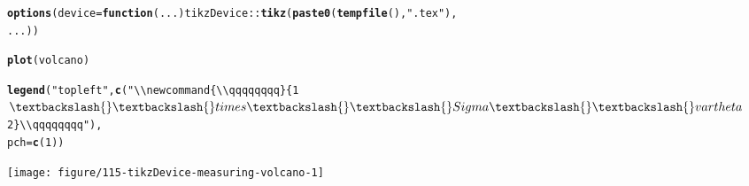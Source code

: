 \documentclass{article}\usepackage[]{graphicx}\usepackage[]{color}
\makeatletter
\def\maxwidth{ %
  \ifdim\Gin@nat@width>\linewidth
    \linewidth
  \else
    \Gin@nat@width
  \fi
}
\newcommand{\hlnum}[1]{\textcolor[rgb]{0.686,0.059,0.569}{#1}}%
\newcommand{\hlstr}[1]{\textcolor[rgb]{0.192,0.494,0.8}{#1}}%
\newcommand{\hlopt}[1]{\textcolor[rgb]{0,0,0}{#1}}%
\newcommand{\hlstd}[1]{\textcolor[rgb]{0.345,0.345,0.345}{#1}}%
\newcommand{\hlkwa}[1]{\textcolor[rgb]{0.161,0.373,0.58}{\textbf{#1}}}%
\newcommand{\hlkwc}[1]{\textcolor[rgb]{0.333,0.667,0.333}{#1}}%
\newcommand{\hlkwd}[1]{\textcolor[rgb]{0.737,0.353,0.396}{\textbf{#1}}}%
\newenvironment{kframe}{%
 \def\at@end@of@kframe{}%
 \ifinner\ifhmode%
  \def\at@end@of@kframe{\end{minipage}}%
  \begin{minipage}{\columnwidth}%
 \fi\fi%
 \def\FrameCommand##1{\hskip\@totalleftmargin \hskip-\fboxsep
 \colorbox{shadecolor}{##1}\hskip-\fboxsep
     \hskip-\linewidth \hskip-\@totalleftmargin \hskip\columnwidth}%
 \MakeFramed {\advance\hsize-\width
   \@totalleftmargin\z@ \linewidth\hsize
   \@setminipage}}%
 {\par\unskip\endMakeFramed%
 \at@end@of@kframe}
\newenvironment{knitrout}{}{} %
\makeatother
\begin{document}
\begin{knitrout}
\color{fgcolor}\begin{kframe}
\begin{alltt}
\hlkwd{options}\hlstd{(}\hlkwc{device} \hlstd{=} \hlkwa{function}\hlstd{(}\hlkwc{...}\hlstd{) tikzDevice}\hlopt{::}\hlkwd{tikz}\hlstd{(}\hlkwd{paste0}\hlstd{(}\hlkwd{tempfile}\hlstd{(),} \hlstr{".tex"}\hlstd{),}
    \hlstd{...))}
\end{alltt}
\end{kframe}
\end{knitrout}

\begin{knitrout}
\color{fgcolor}\begin{kframe}
\begin{alltt}
\hlkwd{plot}\hlstd{(volcano)}
\end{alltt}


{\ttfamily\noindent\itshape\color{messagecolor}{\#\# Creating new TikZ metrics dictionary at:\\\#\# 	115-tikzDevice-measuring-tikzDictionary\\\#\# Using TikZ metrics dictionary at:\\\#\# 	115-tikzDevice-measuring-tikzDictionary}}\begin{alltt}
\hlkwd{legend}\hlstd{(}\hlstr{"topleft"}\hlstd{,} \hlkwd{c}\hlstd{(}\hlstr{"\textbackslash{}\textbackslash{}newcommand\{\textbackslash{}\textbackslash{}qqqqqqqq\}\{1 $\textbackslash{}\textbackslash{}times \textbackslash{}\textbackslash{}Sigma \textbackslash{}\textbackslash{}vartheta$ 2\}\textbackslash{}\textbackslash{}qqqqqqqq"}\hlstd{),}
    \hlkwc{pch} \hlstd{=} \hlkwd{c}\hlstd{(}\hlnum{1}\hlstd{))}
\end{alltt}
\end{kframe}
\texttt{[image: figure/115-tikzDevice-measuring-volcano-1]} 

\end{knitrout}
\end{document}
